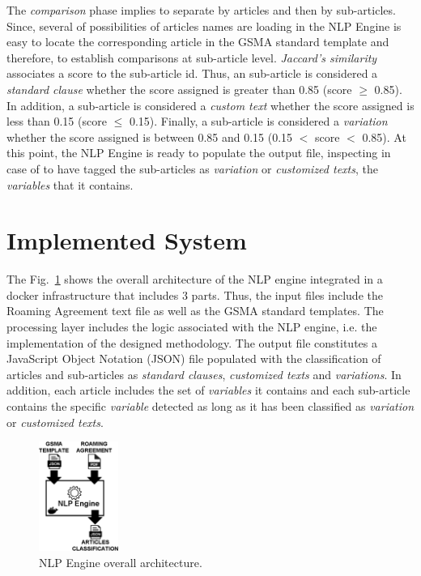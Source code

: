\documentclass[conference]{style/IEEEtran}
\begin{document}
The \textit{comparison} phase implies to separate by articles and then by sub-articles. Since, several of possibilities of articles names are loading in the NLP Engine is easy to locate the corresponding article in the GSMA standard template and therefore, to establish comparisons at sub-article level. \textit{Jaccard's similarity} associates a score to the sub-article id. Thus, an sub-article is considered a \textit{standard clause} whether the score assigned is greater than 0.85 (score $\geq$ 0.85). In addition, a sub-article is considered a \textit{custom text} whether the score assigned is less than 0.15 (score $\leq$ 0.15). Finally, a sub-article is considered a \textit{variation} whether the score assigned is between 0.85 and 0.15 (0.15 $<$ score $<$ 0.85). At this point, the NLP Engine is ready to populate the output file, inspecting in case of to have tagged the sub-articles as \textit{variation} or \textit{customized texts}, the \textit{variables} that it contains.

\section{Implemented System}
The Fig.~\ref{fig2} shows the overall architecture of the NLP engine integrated in a docker infrastructure that includes 3 parts. Thus, the input files include the Roaming Agreement text file as well as the GSMA standard templates. The processing layer includes the logic associated with the NLP engine, i.e. the implementation of the designed methodology. The output file constitutes a JavaScript Object Notation (JSON) file populated with the classification of articles and sub-articles as \textit{standard clauses}, \textit{customized texts} and \textit{variations}. In addition, each article includes the set of \textit{variables} it contains and each sub-article contains the specific \textit{variable} detected as long as it has been classified as \textit{variation} or \textit{customized texts}.

\begin{figure}[htbp]
\centerline{\includegraphics[width=0.23\textwidth]{images/NLP_Engine.png}}
\caption{NLP Engine overall architecture.}
\label{fig2}
\end{figure}
\end{document}

